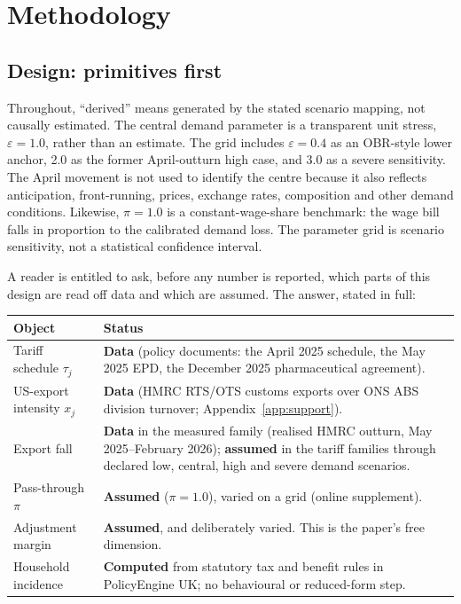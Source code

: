 \section{Methodology}\label{sec:methodology}

\subsection{Design: primitives first}\label{sec:method-primitives}

Throughout, ``derived'' means generated by the stated scenario mapping, not causally estimated. The central demand parameter is a transparent unit stress, $\varepsilon=1.0$, rather than an estimate. The grid includes $\varepsilon=0.4$ as an OBR-style lower anchor, 2.0 as the former April-outturn high case, and 3.0 as a severe sensitivity. The April movement is not used to identify the centre because it also reflects anticipation, front-running, prices, exchange rates, composition and other demand conditions. Likewise, $\pi=1.0$ is a constant-wage-share benchmark: the wage bill falls in proportion to the calibrated demand loss. The parameter grid is scenario sensitivity, not a statistical confidence interval.

A reader is entitled to ask, before any number is reported, which parts of this design are read off data and which are assumed. The answer, stated in full:

\begin{center}
\small
\begin{tabular}{p{}p{}}
\toprule
Object & Status \\
\midrule
Tariff schedule $\tau_j$ & \textbf{Data} (policy documents: the April 2025 schedule, the May 2025 EPD, the December 2025 pharmaceutical agreement). \\
US-export intensity $x_j$ & \textbf{Data} (HMRC RTS/OTS customs exports over ONS ABS division turnover; Appendix~\ref{app:support}). \\
Export fall & \textbf{Data} in the measured family (realised HMRC outturn, May 2025--February 2026); \textbf{assumed} in the tariff families through declared low, central, high and severe demand scenarios. \\
Pass-through $\pi$ & \textbf{Assumed} ($\pi = 1.0$), varied on a grid (online supplement). \\
Adjustment margin & \textbf{Assumed}, and deliberately varied. This is the paper's free dimension. \\
Household incidence & \textbf{Computed} from statutory tax and benefit rules in PolicyEngine UK; no behavioural or reduced-form step. \\
\bottomrule
\end{tabular}
\end{center}

